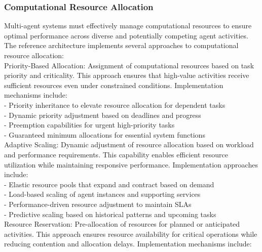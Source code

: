 \subsubsection{Computational Resource Allocation}
Multi-agent systems must effectively manage computational resources to ensure optimal performance across diverse and potentially competing agent activities. The reference architecture implements several approaches to computational resource allocation:\\ \newline
Priority-Based Allocation: Assignment of computational resources based on task priority and criticality. This approach ensures that high-value activities receive sufficient resources even under constrained conditions. Implementation mechanisms include:\\ \newline
- Priority inheritance to elevate resource allocation for dependent tasks\\ \newline
- Dynamic priority adjustment based on deadlines and progress\\ \newline
- Preemption capabilities for urgent high-priority tasks\\ \newline
- Guaranteed minimum allocations for essential system functions\\ \newline
Adaptive Scaling: Dynamic adjustment of resource allocation based on workload and performance requirements. This capability enables efficient resource utilization while maintaining responsive performance. Implementation approaches include:\\ \newline
- Elastic resource pools that expand and contract based on demand\\ \newline
- Load-based scaling of agent instances and supporting services\\ \newline
- Performance-driven resource adjustment to maintain SLAs\\ \newline
- Predictive scaling based on historical patterns and upcoming tasks\\ \newline
Resource Reservation: Pre-allocation of resources for planned or anticipated activities. This approach ensures resource availability for critical operations while reducing contention and allocation delays. Implementation mechanisms include:\\ \newline

